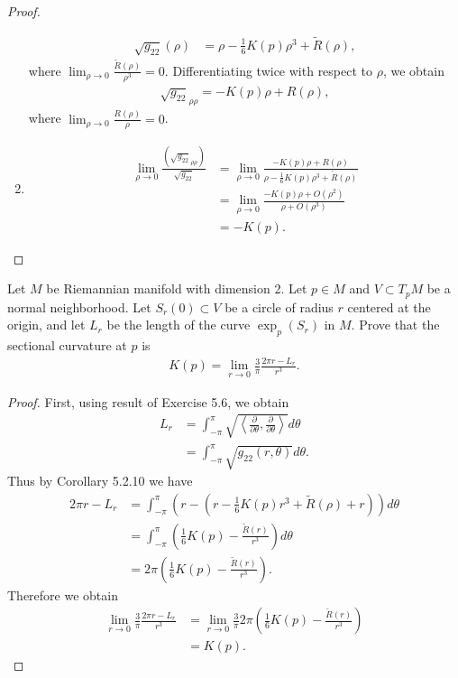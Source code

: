 \documentclass[12pt]{article}
\begin{document}
\begin{proof}
\begin{enumerate}[label=(\alph*)]
\begin{align*}
\sqrt{g_{22}}(\rho)  &= \rho - \frac{1}{6} K(p) \rho^3 + \widetilde{ R}(\rho) ,
\end{align*}
where $ \lim_{ \rho \to 0} \frac{\widetilde{ R}(\rho)}{ \rho^3} =0$. Differentiating twice with respect to $ \rho$, we obtain
\begin{align*}
	\sqrt{g_{22}}_{\rho \rho} = - K(p) \rho + R(\rho), 
\end{align*}
where $ \lim_{ \rho \to 0} \frac{R(\rho)}{ \rho} = 0$.
\item
\begin{align*}
\lim_{ \rho \to 0} \frac{(\sqrt{g_{22}}_{\rho \rho} )}{\sqrt{g_{ 22}}  } &= \lim_{ \rho \to 0} \frac{-K(p)\rho + R(\rho)}{ \rho - \frac{1}{6} K(p) \rho^3 + \widetilde{ R}(\rho)} \\
&= \lim_{ \rho \to 0} \frac{-K(p)\rho + O(\rho^2)}{ \rho + O(\rho^3)} \\
&= -K(p) .
\end{align*}
\end{enumerate}
\end{proof}

\begin{problem}[5.7]
Let $ M$ be Riemannian manifold with dimension 2. Let  $ p \in M$ and $ V \subset T_pM$ be a normal neighborhood. Let $ S_r(0) \subset V$ be a circle of radius $ r$ centered at the origin, and let  $ L_r$ be the length of the curve  $ \exp_p(S_r)$ in $ M$. Prove that the sectional curvature at $ p$ is
 \begin{align*}
	K(p) = \lim_{ r \to 0} \frac{3}{\pi} \frac{2\pi r - L_r}{ r^3}.
\end{align*}
\end{problem}
\begin{proof}
First, using result of Exercise 5.6, we obtain
\begin{align*}
	L_r &= \int_{ -\pi}^{ \pi} \sqrt{ \left\langle \frac{\partial }{\partial \theta} , \frac{\partial }{\partial \theta}   \right\rangle} d \theta \\  
	&= \int_{ -\pi}^{ \pi} \sqrt{g_{22}(r,\theta)} d \theta   .
\end{align*}
Thus by Corollary 5.2.10 we have
\begin{align*}
	2 \pi r - L_r &= \int_{ -\pi}^{ \pi} \left( r- \left( r - \frac{1}{6} K(p) r^3 + \widetilde{ R}(\rho) + r \right)  \right)  d \theta \\
	&= \int_{ -\pi}^{ \pi} \left( \frac{1}{6} K(p) - \frac{\widetilde{ R}(r)}{ r^3} \right)  d \theta \\
	&= 2\pi \left( \frac{1}{6} K(p) - \frac{\widetilde{ R}(r)}{ r^3} \right)  .
\end{align*}
Therefore we obtain
\begin{align*}
	\lim_{ r \to 0} \frac{3}{\pi} \frac{2\pi r - L_r}{ r^3}&= \lim_{ r \to 0} \frac{3}{\pi} 2\pi\left( \frac{1}{6} K(p) - \frac{\widetilde{ R}(r)}{ r^3} \right)     \\
	&= K(p).
\end{align*}
\end{proof}
\end{document}

